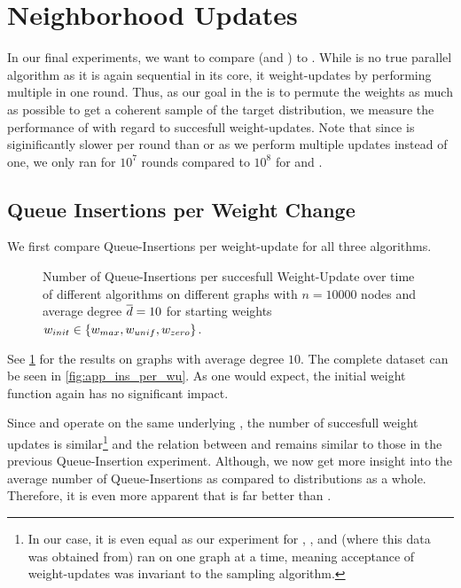 \section{Neighborhood Updates}\label{sec:exp_neighbor}
In our final experiments, we want to compare \algbp (and \algsp) to \algns.
While \algns is no true parallel algorithm as it is again sequential in its core, it  weight-updates by performing multiple in one round.
Thus, as our goal in the \markov is to permute the weights as much as possible to get a coherent sample of the target distribution, we measure the performance of \algns with regard to succesfull weight-updates.
Note that since \algns is siginificantly slower per round than \algbp or \algsp as we perform multiple updates instead of one, we only ran \algns for $10^7$ rounds compared to $10^8$ for \algbp and \algsp.

\subsection{Queue Insertions per Weight Change}
We first compare Queue-Insertions per weight-update for all three algorithms.

\begin{figure}[!tb]
  \centering
  \caption{
    Number of Queue-Insertions per succesfull Weight-Update over time of different algorithms on different graphs with $n = 10000$ nodes and average degree $\overline{d} = 10$ for starting weights $w_{init} \in \left\{w_{max}, w_{unif}, w_{zero}\right\}$.
  }
  \label{fig:ins_per_wu}
\end{figure}

See \cref{fig:ins_per_wu} for the results on graphs with average degree $10$.
The complete dataset can be seen in \cref{fig:app_ins_per_wu}.
As one would expect, the initial weight function again has no significant impact.

Since \algsp and \algbp operate on the same underlying \markov, the number of succesfull weight updates is similar\footnote{
  In our case, it is even equal as our experiment for \algbf, \algsp, and \algbp (where this data was obtained from) ran on one graph at a time, meaning acceptance of weight-updates was invariant to the sampling algorithm.
} and the relation between \algbp and \algsp remains similar to those in the previous Queue-Insertion experiment.
Although, we now get more insight into the average number of Queue-Insertions as compared to distributions as a whole.
Therefore, it is even more apparent that \algbp is far better than \algsp.

